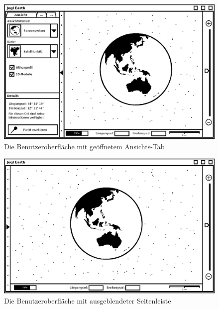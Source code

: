 \documentclass[10pt]{scrreprt}
\begin{document}
\begin{figure}
	\centering
	\includegraphics[scale=0.9]{GUI-Ansicht.eps}
	\caption{Die Benutzeroberfläche mit geöffnetem Ansichts-Tab}
\end{figure}
\begin{figure}
	\centering
	\includegraphics[scale=0.9]{GUI-Ausgeblendet.eps}
	\caption{Die Benutzeroberfläche mit ausgeblendeter Seitenleiste}
\end{figure}
\end{document}
